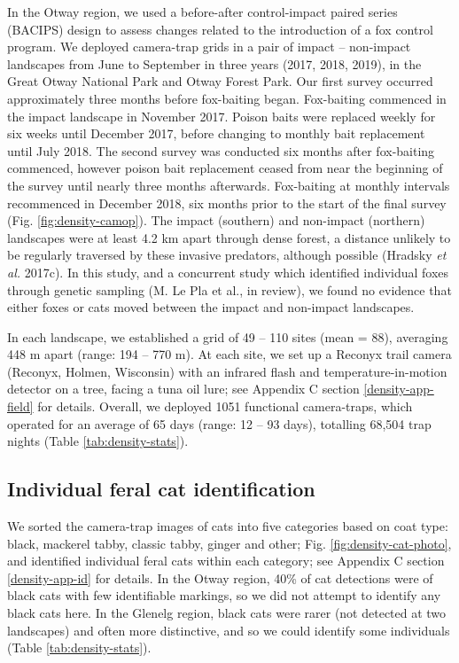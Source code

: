 \documentclass[11pt,a4paper,titlepage,twoside,openright]{style/unimelbthesis}
\begin{document}
\begin{mainmatter}
In the Otway region, we used a before-after control-impact paired series (BACIPS) design to assess changes related to the introduction of a fox control program. We deployed camera-trap grids in a pair of impact -- non-impact landscapes from June to September in three years (2017, 2018, 2019), in the Great Otway National Park and Otway Forest Park. Our first survey occurred approximately three months before fox-baiting began. Fox-baiting commenced in the impact landscape in November 2017. Poison baits were replaced weekly for six weeks until December 2017, before changing to monthly bait replacement until July 2018. The second survey was conducted six months after fox-baiting commenced, however poison bait replacement ceased from near the beginning of the survey until nearly three months afterwards. Fox-baiting at monthly intervals recommenced in December 2018, six months prior to the start of the final survey (Fig. \ref{fig:density-camop}). The impact (southern) and non-impact (northern) landscapes were at least 4.2 km apart through dense forest, a distance unlikely to be regularly traversed by these invasive predators, although possible (Hradsky \emph{et al.} 2017c). In this study, and a concurrent study which identified individual foxes through genetic sampling (M. Le Pla et al., in review), we found no evidence that either foxes or cats moved between the impact and non-impact landscapes.

In each landscape, we established a grid of 49 -- 110 sites (mean = 88), averaging 448 m apart (range: 194 -- 770 m). At each site, we set up a Reconyx trail camera (Reconyx, Holmen, Wisconsin) with an infrared flash and temperature-in-motion detector on a tree, facing a tuna oil lure; see Appendix C section \ref{density-app-field} for details. Overall, we deployed 1051 functional camera-traps, which operated for an average of 65 days (range: 12 -- 93 days), totalling 68,504 trap nights (Table \ref{tab:density-stats}).

\hypertarget{individual-feral-cat-identification}{%
\subsection{Individual feral cat identification}\label{individual-feral-cat-identification}}

We sorted the camera-trap images of cats into five categories based on coat type: black, mackerel tabby, classic tabby, ginger and other; Fig. \ref{fig:density-cat-photo}, and identified individual feral cats within each category; see Appendix C section \ref{density-app-id} for details. In the Otway region, 40\% of cat detections were of black cats with few identifiable markings, so we did not attempt to identify any black cats here. In the Glenelg region, black cats were rarer (not detected at two landscapes) and often more distinctive, and so we could identify some individuals (Table \ref{tab:density-stats}).


\end{mainmatter}
\end{document}
